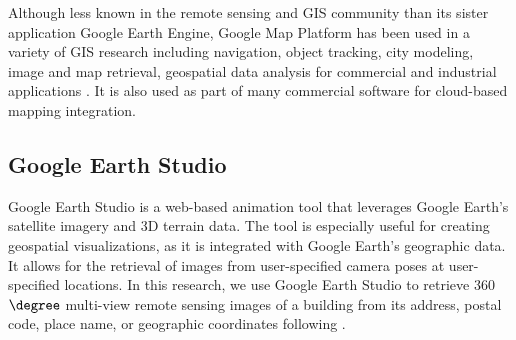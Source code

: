 Although less known in the remote sensing and GIS community than its sister application Google Earth Engine, Google Map Platform has been used in a variety of GIS research including navigation, object tracking, city modeling, image and map retrieval, geospatial data analysis for commercial and industrial applications \cite{maps1,maps2,maps3,maps4}. It is also used as part of many commercial software for cloud-based mapping integration. 

\subsection{Google Earth Studio}
Google Earth Studio \cite{google_earth_studio} is a web-based animation tool that leverages Google Earth's satellite imagery and 3D terrain data. The tool is especially useful for creating geospatial visualizations, as it is integrated with Google Earth’s geographic data. It allows for the retrieval of images from user-specified camera poses at user-specified locations. In this research, we use Google Earth Studio to retrieve 360 $\degree$ multi-view remote sensing images of a building from its address, postal code, place name, or geographic coordinates following \cite{gao_3dgs,gbm}.



%
